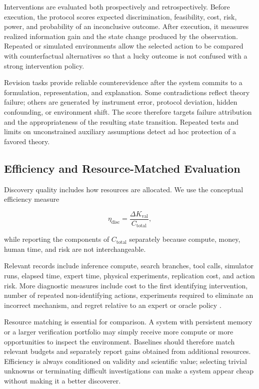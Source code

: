 \documentclass[11pt, a4paper, copyright]{google}
\begin{document}
Interventions are evaluated both prospectively and retrospectively. Before execution, the protocol scores expected discrimination, feasibility, cost, risk, power, and probability of an inconclusive outcome. After execution, it measures realized information gain and the state change produced by the observation. Repeated or simulated environments allow the selected action to be compared with counterfactual alternatives so that a lucky outcome is not confused with a strong intervention policy.

Revision tasks provide reliable counterevidence after the system commits to a formulation, representation, and explanation. Some contradictions reflect theory failure; others are generated by instrument error, protocol deviation, hidden confounding, or environment shift. The score therefore targets failure attribution and the appropriateness of the resulting state transition. Repeated tests and limits on unconstrained auxiliary assumptions detect ad hoc protection of a favored theory.

\subsection{Efficiency and Resource-Matched Evaluation}
\label{subsec:discovery-efficiency}

Discovery quality includes how resources are allocated. We use the conceptual efficiency measure

\begin{equation}
\eta_{\mathrm{disc}}
=
\frac{\Delta K_{\mathrm{val}}}{C_{\mathrm{total}}},
\label{eq:discovery-efficiency}
\end{equation}

while reporting the components of $C_{\mathrm{total}}$ separately because compute, money, human time, and risk are not interchangeable.

Relevant records include inference compute, search branches, tool calls, simulator runs, elapsed time, expert time, physical experiments, replication cost, and action risk. More diagnostic measures include cost to the first identifying intervention, number of repeated non-identifying actions, experiments required to eliminate an incorrect mechanism, and regret relative to an expert or oracle policy \citep{huang2024mlagentbench,chan2025mlebench,garikaparthi2026researchgym}.

Resource matching is essential for comparison. A system with persistent memory or a larger verification portfolio may simply receive more compute or more opportunities to inspect the environment. Baselines should therefore match relevant budgets and separately report gains obtained from additional resources. Efficiency is always conditioned on validity and scientific value; selecting trivial unknowns or terminating difficult investigations can make a system appear cheap without making it a better discoverer.
\end{document}
